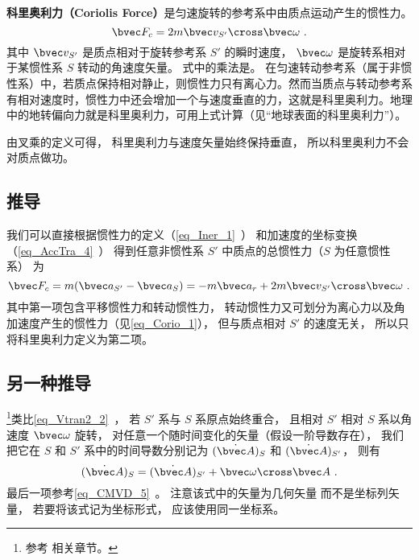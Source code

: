 

\textbf{科里奥利力（Coriolis Force）}是匀速旋转的参考系中由质点运动产生的惯性力。
\begin{equation}
\bvec F_c = 2m \bvec v_{S'} \cross \bvec \omega~.
\end{equation}
其中 $\bvec v_{S'}$ 是质点相对于旋转参考系 $S'$ 的瞬时速度， $\bvec\omega$ 是旋转系相对于某惯性系 $S$ 转动的角速度矢量。
式中的乘法是。
在匀速转动参考系（属于非惯性系）中，若质点保持相对静止，则惯性力只有离心力。然而当质点与转动参考系有相对速度时，惯性力中还会增加一个与速度垂直的力，这就是科里奥利力。地理中的地转偏向力就是科里奥利力，可用上式计算（见“地球表面的科里奥利力”）。

由叉乘的定义可得， 科里奥利力与速度矢量始终保持垂直， 所以科里奥利力不会对质点做功。

\subsection{推导}
我们可以直接根据惯性力的定义（\autoref{eq_Iner_1}~） 和加速度的坐标变换（\autoref{eq_AccTra_4}~） 得到任意非惯性系 $S'$ 中质点的总惯性力（$S$ 为任意惯性系） 为
\begin{equation}
\bvec F_c = m( \bvec a_{S'} - \bvec a_{S} ) = -m\bvec a_{r} + 2 m \bvec v_{S'} \cross  \bvec \omega~.
\end{equation}
其中第一项包含平移惯性力和转动惯性力， 转动惯性力又可划分为离心力以及角加速度产生的惯性力（见\autoref{eq_Corio_1}）， 但与质点相对 $S'$ 的速度无关， 所以只将科里奥利力定义为第二项。

\subsection{另一种推导}\label{sub_Corio_1}
\footnote{参考 \cite{Goldstein} 相关章节。}类比\autoref{eq_Vtran2_2}~， 若 $S'$ 系与 $S$ 系原点始终重合， 且相对 $S'$ 相对 $S$ 系以角速度 $\bvec\omega$ 旋转， 对任意一个随时间变化的矢量（假设一阶导数存在）， 我们把它在 $S$ 和 $S'$ 系中的时间导数分别记为 $(\dot{\bvec A})_{S}$ 和 $(\dot{\bvec A})_{S'}$， 则有
\begin{equation}\label{eq_Corio_4}
(\dot{\bvec A})_{S} = (\dot{\bvec A})_{S'} + \bvec\omega\cross\bvec A~.
\end{equation}
最后一项参考\autoref{eq_CMVD_5}~。 注意该式中的矢量为几何矢量 而不是坐标列矢量， 若要将该式记为坐标形式， 应该使用同一坐标系。

